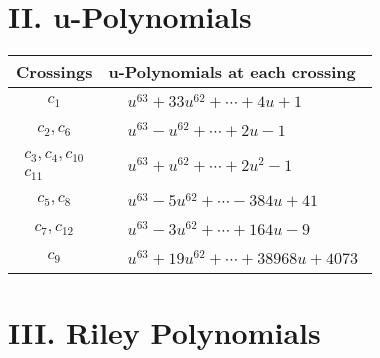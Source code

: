 \documentclass[1p]{elsarticle_modified}
\theoremstyle{definition}
\begin{document}
\newpage\renewcommand{\arraystretch}{1}
\centering \section*{ II. u-Polynomials}
\begin{tabular}{m{50pt}|m{274pt}}
Crossings & \hspace{64pt}u-Polynomials at each crossing \\
\hline $$\begin{aligned}c_{1}\end{aligned}$$&$\begin{aligned}
&u^{63}+33 u^{62}+\cdots+4 u+1
\end{aligned}$\\
\hline $$\begin{aligned}c_{2},c_{6}\end{aligned}$$&$\begin{aligned}
&u^{63}- u^{62}+\cdots+2 u-1
\end{aligned}$\\
\hline $$\begin{aligned}c_{3},c_{4},c_{10}\\c_{11}\end{aligned}$$&$\begin{aligned}
&u^{63}+u^{62}+\cdots+2 u^2-1
\end{aligned}$\\
\hline $$\begin{aligned}c_{5},c_{8}\end{aligned}$$&$\begin{aligned}
&u^{63}-5 u^{62}+\cdots-384 u+41
\end{aligned}$\\
\hline $$\begin{aligned}c_{7},c_{12}\end{aligned}$$&$\begin{aligned}
&u^{63}-3 u^{62}+\cdots+164 u-9
\end{aligned}$\\
\hline $$\begin{aligned}c_{9}\end{aligned}$$&$\begin{aligned}
&u^{63}+19 u^{62}+\cdots+38968 u+4073
\end{aligned}$\\
\hline
\end{tabular}\newpage\renewcommand{\arraystretch}{1}
\centering \section*{ III. Riley Polynomials}
\end{document}
